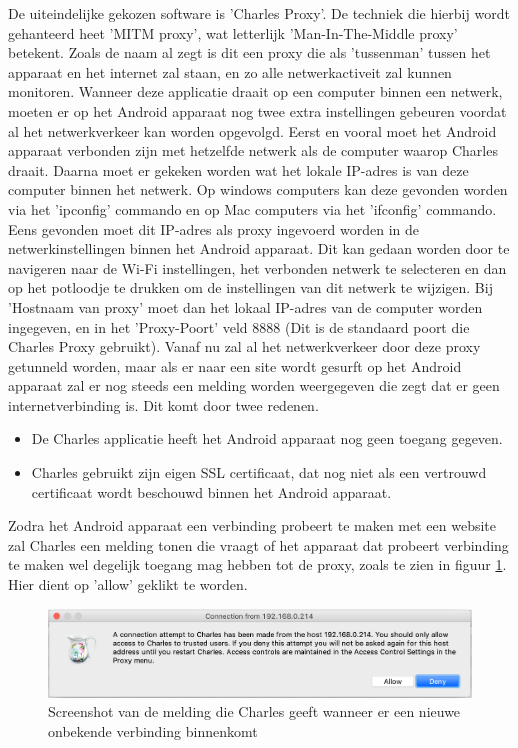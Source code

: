 De uiteindelijke gekozen software is 'Charles Proxy'. De techniek die hierbij wordt gehanteerd heet 'MITM proxy', wat letterlijk 'Man-In-The-Middle proxy' betekent. Zoals de naam al zegt is dit een proxy die als 'tussenman' tussen het apparaat en het internet zal staan, en zo alle netwerkactiveit zal kunnen monitoren. Wanneer deze applicatie draait op een computer binnen een netwerk, moeten er op het Android apparaat nog twee extra instellingen gebeuren voordat al het netwerkverkeer kan worden opgevolgd. Eerst en vooral moet het Android apparaat verbonden zijn met hetzelfde netwerk als de computer waarop Charles draait. Daarna moet er gekeken worden wat het lokale IP-adres is van deze computer binnen het netwerk. Op windows computers kan deze gevonden worden via het 'ipconfig' commando en op Mac computers via het 'ifconfig' commando. Eens gevonden moet dit IP-adres als proxy ingevoerd worden in de netwerkinstellingen binnen het Android apparaat. Dit kan gedaan worden door te navigeren naar de Wi-Fi instellingen, het verbonden netwerk te selecteren en dan op het potloodje te drukken om de instellingen van dit netwerk te wijzigen. Bij 'Hostnaam van proxy' moet dan het lokaal IP-adres van de computer worden ingegeven, en in het 'Proxy-Poort' veld 8888 (Dit is de standaard poort die Charles Proxy gebruikt). Vanaf nu zal al het netwerkverkeer door deze proxy getunneld worden, maar als er naar een site wordt gesurft op het Android apparaat zal er nog steeds een melding worden weergegeven die zegt dat er geen internetverbinding is. Dit komt door twee redenen.

\begin{itemize}
    \item De Charles applicatie heeft het Android apparaat nog geen toegang gegeven.
    \item Charles gebruikt zijn eigen SSL certificaat, dat nog niet als een vertrouwd certificaat wordt beschouwd binnen het Android apparaat.
\end{itemize}

Zodra het Android apparaat een verbinding probeert te maken met een website zal Charles een melding tonen die vraagt of het apparaat dat probeert verbinding te maken wel degelijk toegang mag hebben tot de proxy, zoals te zien in figuur \ref{fig:charlesmelding}. Hier dient op 'allow' geklikt te worden. 

\begin{figure}
    \centering
    \includegraphics[width=1\textwidth]{img/charlesmelding.png}
    \caption{Screenshot van de melding die Charles geeft wanneer er een nieuwe onbekende verbinding binnenkomt}
    \label{fig:charlesmelding}
\end{figure}

